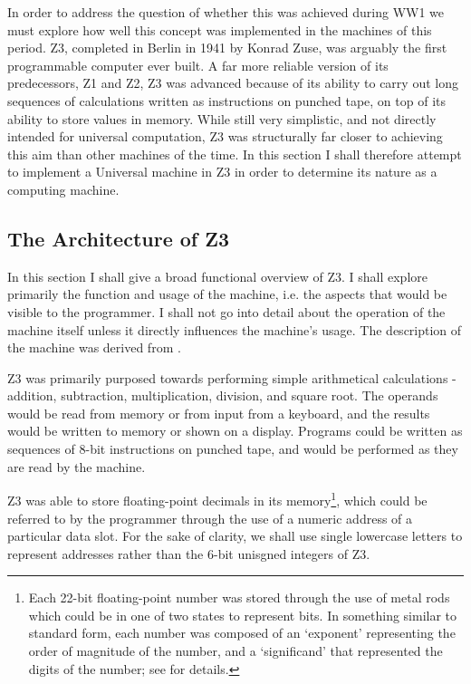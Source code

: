 \documentclass[Master.tex]{subfiles}
\begin{document}
In order to address the question of whether this was achieved during WW1 we must explore how well this concept was implemented in the machines of this period. Z3, completed in Berlin in 1941 by Konrad Zuse, was arguably the first programmable computer ever built. A far more reliable version of its predecessors, Z1 and Z2, Z3 was advanced because of its ability to carry out long sequences of calculations written as instructions on punched tape, on top of its ability to store values in memory. While still very simplistic, and not directly intended for universal computation, Z3 was structurally far closer to achieving this aim than other machines of the time. In this section I shall therefore attempt to implement a Universal machine in Z3 in order to determine its nature as a computing machine.

\subsection{The Architecture of Z3}

In this section I shall give a broad functional overview of Z3. I shall explore primarily the function and usage of the machine, i.e. the aspects that would be visible to the programmer. I shall not go into detail about the operation of the machine itself unless it directly influences the machine's usage. The description of the machine was derived from \cite{rojas1997z3architecture}.

Z3 was primarily purposed towards performing simple arithmetical calculations - addition, subtraction, multiplication, division, and square root. The operands would be read from memory or from input from a keyboard, and the results would be written to memory or shown on a display. Programs could be written as sequences of 8-bit instructions on punched tape, and would be performed as they are read by the machine.

Z3 was able to store floating-point decimals in its memory\footnote{Each 22-bit floating-point number was stored through the use of metal rods which could be in one of two states to represent bits. In  something similar to standard form, each number was composed of an `exponent' representing the order of magnitude of the number, and a `significand' that represented the digits of the number; see \cite{rojas1997z3architecture} for details.}, which could be referred to by the programmer through the use of a numeric address of a particular data slot. For the sake of clarity, we shall use single lowercase letters to represent addresses rather than the 6-bit unisgned integers of Z3.
\end{document}
